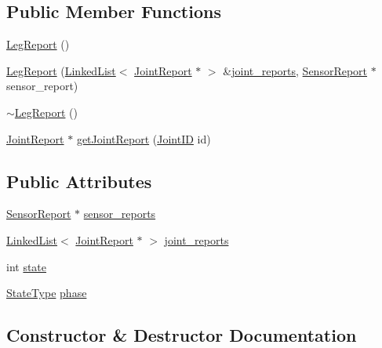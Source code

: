 \subsection*{Public Member Functions}
\begin{DoxyCompactItemize}
\item 
\hyperlink{classLegReport_a25832a00754260f7848f2aa80319168d}{Leg\+Report} ()
\item 
\hyperlink{classLegReport_ac679a7977905177b66a6599e0f2778bf}{Leg\+Report} (\hyperlink{classLinkedList}{Linked\+List}$<$ \hyperlink{classJointReport}{Joint\+Report} $\ast$ $>$ \&\hyperlink{classLegReport_a94f1f235f1faa24880e937bb016a4f73}{joint\+\_\+reports}, \hyperlink{classSensorReport}{Sensor\+Report} $\ast$sensor\+\_\+report)
\item 
\hyperlink{classLegReport_a814e790affa23e796e4e20da546b4c97}{$\sim$\+Leg\+Report} ()
\item 
\hyperlink{classJointReport}{Joint\+Report} $\ast$ \hyperlink{classLegReport_a9f2b8607efa72d243998b7c507ecb148}{get\+Joint\+Report} (\hyperlink{JointSelect_8hpp_a4afd2607cffce38f5ade02dfdc389cc3}{Joint\+ID} id)
\end{DoxyCompactItemize}
\subsection*{Public Attributes}
\begin{DoxyCompactItemize}
\item 
\hyperlink{classSensorReport}{Sensor\+Report} $\ast$ \hyperlink{classLegReport_aac9c68b58fde19ebc0b1fb5a35526d6a}{sensor\+\_\+reports}
\item 
\hyperlink{classLinkedList}{Linked\+List}$<$ \hyperlink{classJointReport}{Joint\+Report} $\ast$ $>$ \hyperlink{classLegReport_a94f1f235f1faa24880e937bb016a4f73}{joint\+\_\+reports}
\item 
int \hyperlink{classLegReport_a16ea3a41dccb407558bcd32c3074255f}{state}
\item 
\hyperlink{States_8hpp_a1615968a92950438f6e67a28e9d56e5c}{State\+Type} \hyperlink{classLegReport_a4d58cf97cf143b71bef251799470f186}{phase}
\end{DoxyCompactItemize}


\subsection{Constructor \& Destructor Documentation}
